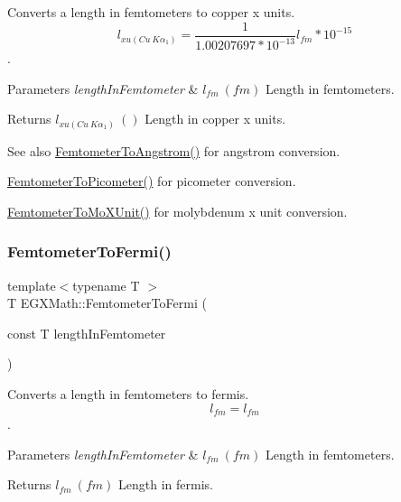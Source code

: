 Converts a length in femtometers to copper x units. \[ l_{xu(Cu\ K\alpha_1)}= \frac{1}{1.00207697*10^{-13}} l_{fm} * 10^{-15}\]. 


\begin{DoxyParams}{Parameters}
{\em length\+In\+Femtometer} & $ l_{fm}\ (fm)$ Length in femtometers. \\
\hline
\end{DoxyParams}
\begin{DoxyReturn}{Returns}
$ l_{xu(Cu\ K\alpha_1)}\ ()$ Length in copper x units. 
\end{DoxyReturn}
\begin{DoxySeeAlso}{See also}
\mbox{\hyperlink{group___e_g_x_math-_conversions-_length_conversions-_femtometer-_non-_s_i_ga72862654ebe3812db0fbf8d11d7059ff}{Femtometer\+To\+Angstrom()}} for angstrom conversion. 

\mbox{\hyperlink{group___e_g_x_math-_conversions-_length_conversions-_femtometer-_s_i_gadfcd6b374d4134cad0ac1ce7a8e50509}{Femtometer\+To\+Picometer()}} for picometer conversion. 

\mbox{\hyperlink{group___e_g_x_math-_conversions-_length_conversions-_femtometer-_non-_s_i_ga57801d7c681362c1a11053233e31c415}{Femtometer\+To\+Mo\+X\+Unit()}} for molybdenum x unit conversion. 
\end{DoxySeeAlso}
\mbox{\label{group___e_g_x_math-_conversions-_length_conversions-_femtometer-_non-_s_i_gaa2e838ef76ce47a3375291d76990b865}} 
\subsubsection{\texorpdfstring{Femtometer\+To\+Fermi()}{FemtometerToFermi()}}
{\footnotesize\ttfamily template$<$typename T $>$ \\
T E\+G\+X\+Math\+::\+Femtometer\+To\+Fermi (\begin{DoxyParamCaption}\item[{const T}]{length\+In\+Femtometer }\end{DoxyParamCaption})}



Converts a length in femtometers to fermis. \[ l_{fm}=l_{fm} \]. 


\begin{DoxyParams}{Parameters}
{\em length\+In\+Femtometer} & $ l_{fm}\ (fm)$ Length in femtometers. \\
\hline
\end{DoxyParams}
\begin{DoxyReturn}{Returns}
$ l_{fm}\ (fm)$ Length in fermis. 
\end{DoxyReturn}
\mbox{\label{group___e_g_x_math-_conversions-_length_conversions-_femtometer-_non-_s_i_gac1a358bdb9bf33dec3cb847cafe1bc71}} 
